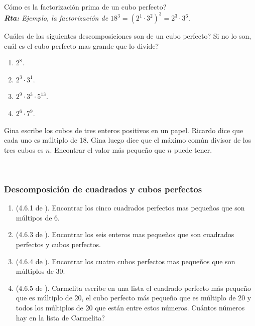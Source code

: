 \begin{ejemplo}
	Cómo es la factorización prima de un cubo perfecto?\\
	\textit{\textbf{Rta:} Ejemplo, la factorización de $18^3={(2^1\cdot 3^2)}^3=2^3\cdot 3^6$}.
	
	Cuáles de las siguientes descomposiciones son de un cubo perfecto? Si no lo son, cuál es el cubo perfecto mas grande que lo divide?
	\begin{enumerate}[label=\Alph*)]
		\item $2^8$. 
		\item $2^3\cdot3^1$. 
		\item $2^{9}\cdot3^3\cdot 5^{13}$.
		\item $2^6\cdot 7^9$.
	\end{enumerate}
\end{ejemplo}

\begin{ejemplo}
	Gina escribe los cubos de tres enteros positivos en un papel. Ricardo dice que cada uno es múltiplo de 18. Gina luego dice que el máximo común divisor de los tres cubos es $n$. Encontrar el valor más pequeño que $n$ puede tener.
\end{ejemplo}

\newpage
\begin{exers}{\ \\}
	\begin{center}
		\vspace{-1cm}
		\subsubsection*{ Descomposición de cuadrados y cubos perfectos }\label{ejercicios_subsubsection_cuadrados_y_cubos_perfectos}
	\end{center}

	
	\begin{enumerate}
		\item (4.6.1 de \cite{Aops_TN}). Encontrar los cinco cuadrados perfectos mas pequeños que son múltipos de 6.
		\item (4.6.3 de \cite{Aops_TN}). Encontrar los seis enteros mas pequeños que son cuadrados perfectos y cubos perfectos.	
		\item (4.6.4 de \cite{Aops_TN}). Encontrar los cuatro cubos perfectos mas pequeños que son múltiplos de 30.
		\item (4.6.5 de \cite{Aops_TN}). Carmelita escribe en una lista el cuadrado perfecto más pequeño que es múltiplo de 20,  el cubo perfecto más pequeño que es múltiplo de 20 y todos los múltiplos de 20 que están entre estos números. Cuántos números hay en la lista de Carmelita?
	\end{enumerate}
\end{exers}
\newpage

